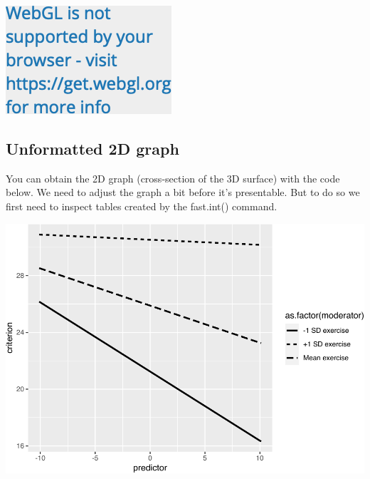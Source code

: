 \documentclass[
]{krantz}
\makeatletter
\newenvironment{Shaded}{\begin{snugshade}}{\end{snugshade}}
\newcommand{\FunctionTok}[1]{\textcolor[rgb]{0,0,0}{#1}}
\newcommand{\NormalTok}[1]{#1}
\newcommand{\OtherTok}[1]{\textcolor[rgb]{0.37,0.37,0.37}{#1}}
\newcommand{\SpecialCharTok}[1]{\textcolor[rgb]{0,0,0}{#1}}
\newenvironment{kframe}{%
\medskip{}
\setlength{\fboxsep}{.8em}
 \def\at@end@of@kframe{}%
 \ifinner\ifhmode%
  \def\at@end@of@kframe{\end{minipage}}%
  \begin{minipage}{\columnwidth}%
 \fi\fi%
 \def\FrameCommand##1{\hskip\@totalleftmargin \hskip-\fboxsep
 \colorbox{shadecolor}{##1}\hskip-\fboxsep
     \hskip-\linewidth \hskip-\@totalleftmargin \hskip\columnwidth}%
 \MakeFramed {\advance\hsize-\width
   \@totalleftmargin\z@ \linewidth\hsize
   \@setminipage}}%
 {\par\unskip\endMakeFramed%
 \at@end@of@kframe}
\renewenvironment{Shaded}{\begin{kframe}}{\end{kframe}}
\makeatother
\begin{document}
\begin{Shaded}
\end{Shaded}

\includegraphics{bookdown_files/figure-latex/unnamed-chunk-494-1.png}

\hypertarget{unformatted-2d-graph}{%
\subsection{Unformatted 2D graph}\label{unformatted-2d-graph}}

You can obtain the 2D graph (cross-section of the 3D surface) with the code below. We need to adjust the graph a bit before it's presentable. But to do so we first need to inspect tables created by the fast.int() command.

\begin{Shaded}
\end{Shaded}

\includegraphics{bookdown_files/figure-latex/unnamed-chunk-495-1.pdf}
\end{document}
